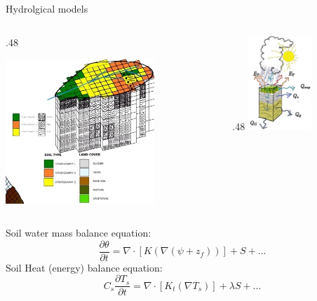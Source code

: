 \documentclass[ignorenonframetext,]{beamer}
\def\begincols{\begin{columns}}
\def\begincol{\begin{column}}
\def\endcol{\end{column}}
\def\endcols{\end{columns}}
\begin{document}
\begin{frame}{Hydrolgical models}

\begincols
 \begincol{.48\textwidth}

\includegraphics[width=0.70000\textwidth]{resources/images/geotop_grid_mod.jpg}~

\endcol
\begincol{.48\textwidth}
\includegraphics[width=0.50000\textwidth]{resources/images/water_balance.png}\\
\endcol
\endcols
Soil water mass balance equation:
\[\frac{\partial \theta}{\partial t} =   \nabla  \cdot \left[ K \left(\nabla (\psi+z_f) \right) \right] + S + ...\]
Soil Heat (energy) balance equation:
\[C_s \frac{\partial T_s}{\partial t} =  \nabla  \cdot \left[ K_t  ( \nabla T_s  ) \right] + \lambda S + ...\]

\end{frame}
\end{document}
